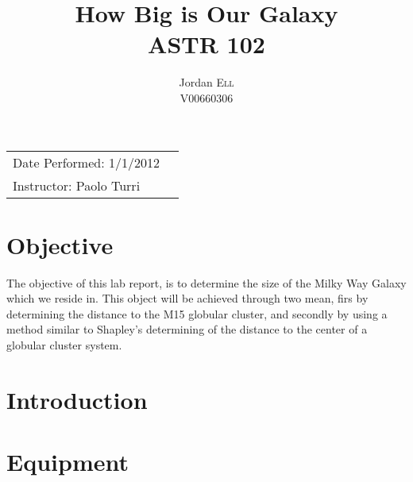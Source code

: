 \documentclass{article}
\title{How Big is Our Galaxy \\ ASTR 102} %
\author{Jordan \textsc{Ell} \\ V00660306} %
\begin{document}
\maketitle %

\begin{tabular}{lr}
Date Performed: 1/1/2012\\ %
Instructor: Paolo Turri %
\end{tabular}

\setlength\parindent{0pt} %

\renewcommand{\labelenumi}{\alph{enumi}.} %


\section{Objective}

The objective of this lab report, is to determine the size of the Milky Way Galaxy which
we reside in. This object will be achieved through two mean, firs by determining the 
distance to the M15 globular cluster, and secondly by using a method similar to Shapley's
determining of the distance to the center of a globular cluster system.
 

\section{Introduction}




\section{Equipment}
\end{document}
